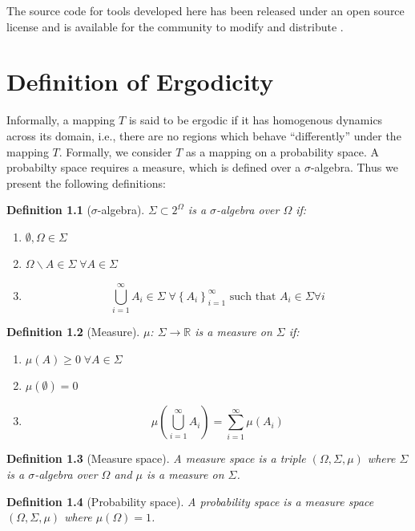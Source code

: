 \documentclass{report}
\begin{document}
The source code for tools developed here has been released under an open source license \cite{gpl} and is available for the community to modify and distribute \cite{github}.

\appendix
\chapter{Definition of Ergodicity}
\label{sec:ergodicity}

Informally, a mapping $T$ is said to be ergodic if it has homogenous dynamics across its domain, i.e., there are no regions which behave ``differently'' under the mapping $T$. Formally, we consider $T$ as a mapping on a probability space. A probabilty space requires a measure, which is defined over a $\sigma$-algebra. Thus we present the following definitions:

\newtheorem{dfn}{Definition}
\begin{dfn}[$\sigma$-algebra]
$\Sigma \subset 2^{\Omega}$ is a \emph{$\sigma$-algebra} over $\Omega$ if:
\begin{enumerate}
\item
$\emptyset, \Omega \in \Sigma$
\item
$\Omega \backslash A \in \Sigma \; \forall A \in \Sigma$
\item
\[
\bigcup_{i=1}^{\infty}A_{i} \in \Sigma \; \forall \left\{A_{i}\right\}_{i=1}^{\infty}\text{ such that }A_{i} \in \Sigma \forall i
\]
\end{enumerate}
\end{dfn}

\begin{dfn}[Measure]
$\mu$: $\Sigma \rightarrow \mathbb{R}$ is a \emph{measure} on $\Sigma$ if:
\begin{enumerate}
\item
$\mu(A) \ge 0 \; \forall A \in \Sigma$
\item
$\mu(\emptyset) = 0$
\item
\[
\mu\left(\bigcup_{i=1}^{\infty} A_{i} \right) = \sum_{i=1}^{\infty} \mu(A_{i})
\]
\end{enumerate}
\end{dfn}

\begin{dfn}[Measure space]
A \emph{measure space} is a triple $(\Omega, \Sigma, \mu)$ where $\Sigma$ is a $\sigma$-algebra over $\Omega$ and $\mu$ is a measure on $\Sigma$.
\end{dfn}

\begin{dfn}[Probability space]
A \emph{probability space} is a measure space $(\Omega, \Sigma, \mu)$ where $\mu(\Omega) = 1$.
\end{dfn}
\end{document}
